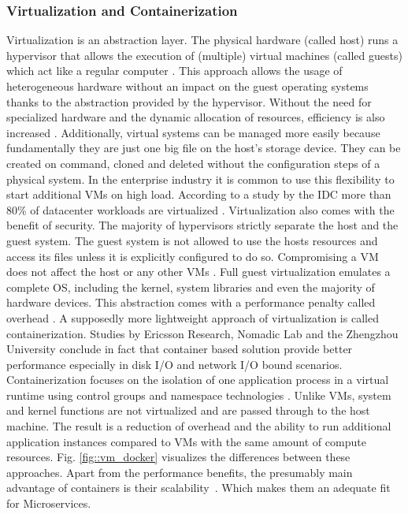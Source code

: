 \documentclass[12pt, a4paper]{article}
\begin{document}
        \subsubsection{Virtualization and Containerization}
        Virtualization is an abstraction layer. The physical hardware (called host) runs a hypervisor that allows the execution of (multiple) virtual machines (called guests) which act like a regular computer \cite{vmbasics}. This approach allows the usage of heterogeneous hardware without an impact on the guest operating systems thanks to the abstraction provided by the hypervisor. Without the need for specialized hardware and the dynamic allocation of resources, efficiency is also increased \cite{redhat_venv}. Additionally, virtual systems can be managed more easily because fundamentally they are just one big file on the host's storage device. They can be created on command, cloned and deleted without the configuration steps of a physical system. In the enterprise industry it is common to use this flexibility to start additional \ac{VM}s on high load. According to a study by the \ac{IDC} more than 80\% of datacenter workloads are virtualized \cite{virtualaddoption}. Virtualization also comes with the benefit of security. The majority of hypervisors strictly separate the host and the guest system. The guest system is not allowed to use the hosts resources and access its files unless it is explicitly configured to do so. Compromising a \ac{VM} does not affect the host or any other \ac{VM}s \cite{redhat_venv}.\newline
        Full guest virtualization emulates a complete \ac{OS}, including the kernel, system libraries and even the majority of hardware devices. This abstraction comes with a performance penalty called overhead \cite{vmbasics}. A supposedly more lightweight approach of virtualization is called containerization. Studies by Ericsson Research, Nomadic Lab \cite{ieee_perfomance} and the Zhengzhou University \cite{zhengzhou_university} conclude in fact that container based solution provide better performance especially in disk \acs{I/O} and network \acs{I/O} bound scenarios. Containerization focuses on the isolation of one application process in a virtual runtime using control groups and namespace technologies \cite{cgroups}. Unlike \ac{VM}s, system and kernel functions are not virtualized and are passed through to the host machine. The result is a reduction of overhead and the ability to run additional application instances compared to \ac{VM}s with the same amount of compute resources. Fig. \ref{fig::vm_docker} visualizes the differences between these approaches.\newline
        Apart from the performance benefits, the presumably main advantage of containers is their scalability~\cite{cintainer_scale}. Which makes them an adequate fit for Microservices.
\end{document}

